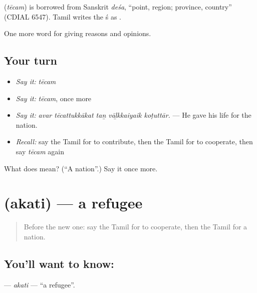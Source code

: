 \begin{cousinweb}
\textbf{} (\emph{tēcam}) is borrowed from Sanskrit \emph{deśa}, \textquotedblleft{}point, region; province, country\textquotedblright{} (CDIAL 6547). Tamil writes the ś as .
\end{cousinweb}

\begin{grammarlens}[title={What you've built}]
One more word for giving reasons and opinions.
\end{grammarlens}

\subsection*{Your turn}
\begin{itemize}
\raggedright
  \item \emph{Say it:} \emph{tēcam}
  \item \emph{Say it:} \emph{tēcam}, once more
  \item \emph{Say it:} \emph{avar tēcattukkākat taṉ vāḻkkaiyaik koṭuttār.} — He gave his life for the nation.
  \item \emph{Recall:} say the Tamil for to contribute, then the Tamil for to cooperate, then say \emph{tēcam} again
\end{itemize}

\begin{tcolorbox}[breakable,colback=teal!4,colframe=teal!35!black,title={Before you move on}]
What does  mean? (\textquotedblleft{}A nation\textquotedblright{}.) Say it once more.
\end{tcolorbox}
\section[\texorpdfstring{\ta{அகதி} (akati)}{அகதி (akati)}]{ (akati) — a refugee}

\label{lesson:TA-C381-akati}



\begin{quote}
Before the new one: say the Tamil for to cooperate, then the Tamil for a nation.
\end{quote}

\subsection*{You'll want to know: }
\textbf{} — \emph{akati} — \textquotedblleft{}a refugee\textquotedblright{}.

